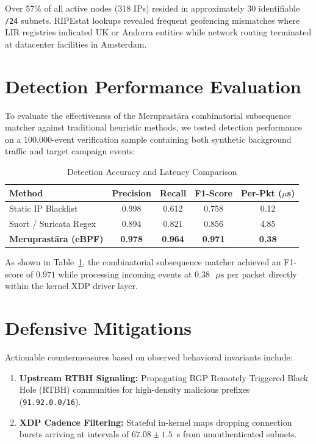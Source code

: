 \documentclass[10pt,twocolumn]{article}
\begin{document}
Over 57\% of all active nodes (318 IPs) resided in approximately 30 identifiable \texttt{/24} subnets. RIPEstat lookups revealed frequent geofencing mismatches where LIR registries indicated UK or Andorra entities while network routing terminated at datacenter facilities in Amsterdam.

\section{Detection Performance Evaluation}
To evaluate the effectiveness of the Meruprast\={a}ra combinatorial subsequence matcher against traditional heuristic methods, we tested detection performance on a 100,000-event verification sample containing both synthetic background traffic and target campaign events:

\begin{table}[h]
\centering
\small
\caption{Detection Accuracy and Latency Comparison}
\label{tab:eval}
\begin{tabular}{lcccc}
\toprule
\textbf{Method} & \textbf{Precision} & \textbf{Recall} & \textbf{F1-Score} & \textbf{Per-Pkt ($\mu$s)} \\
\midrule
Static IP Blacklist & 0.998 & 0.612 & 0.758 & 0.12 \\
Snort / Suricata Regex & 0.894 & 0.821 & 0.856 & 4.85 \\
\textbf{Meruprast\={a}ra (eBPF)} & \textbf{0.978} & \textbf{0.964} & \textbf{0.971} & \textbf{0.38} \\
\bottomrule
\end{tabular}
\end{table}

As shown in Table~\ref{tab:eval}, the combinatorial subsequence matcher achieved an F1-score of $0.971$ while processing incoming events at $0.38\text{ }\mu\text{s}$ per packet directly within the kernel XDP driver layer.

\section{Defensive Mitigations}
Actionable countermeasures based on observed behavioral invariants include:
\begin{enumerate}
    \item \textbf{Upstream RTBH Signaling:} Propagating BGP Remotely Triggered Black Hole (RTBH) communities for high-density malicious prefixes (\texttt{91.92.0.0/16}).
    \item \textbf{XDP Cadence Filtering:} Stateful in-kernel maps dropping connection bursts arriving at intervals of $67.08 \pm 1.5$~s from unauthenticated subnets.
\end{enumerate}
\end{document}
